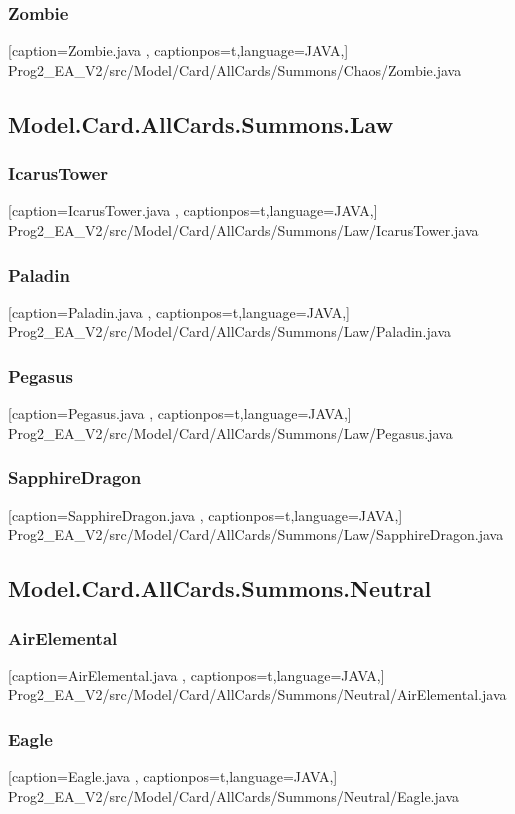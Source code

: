 \documentclass[a4paper,12pt]{scrartcl}
\begin{document}
	\subsubsection{Zombie}
	
	[caption={Zombie.java}
	\label{lst:javaclass},
	captionpos=t,language=JAVA,]
	{Prog2_EA_V2/src/Model/Card/AllCards/Summons/Chaos/Zombie.java}
	\subsection{Model.Card.AllCards.Summons.Law}
	\subsubsection{IcarusTower}
	
	[caption={IcarusTower.java}
	\label{lst:javaclass},
	captionpos=t,language=JAVA,]
	{Prog2_EA_V2/src/Model/Card/AllCards/Summons/Law/IcarusTower.java}
	\subsubsection{Paladin}
	
	[caption={Paladin.java}
	\label{lst:javaclass},
	captionpos=t,language=JAVA,]
	{Prog2_EA_V2/src/Model/Card/AllCards/Summons/Law/Paladin.java}
	\subsubsection{Pegasus}
	
	[caption={Pegasus.java}
	\label{lst:javaclass},
	captionpos=t,language=JAVA,]
	{Prog2_EA_V2/src/Model/Card/AllCards/Summons/Law/Pegasus.java}
	\subsubsection{SapphireDragon}
	
	[caption={SapphireDragon.java}
	\label{lst:javaclass},
	captionpos=t,language=JAVA,]
	{Prog2_EA_V2/src/Model/Card/AllCards/Summons/Law/SapphireDragon.java}
	\subsection{Model.Card.AllCards.Summons.Neutral}
	\subsubsection{AirElemental}
	
	[caption={AirElemental.java}
	\label{lst:javaclass},
	captionpos=t,language=JAVA,]
	{Prog2_EA_V2/src/Model/Card/AllCards/Summons/Neutral/AirElemental.java}
	\subsubsection{Eagle}
	
	[caption={Eagle.java}
	\label{lst:javaclass},
	captionpos=t,language=JAVA,]
	{Prog2_EA_V2/src/Model/Card/AllCards/Summons/Neutral/Eagle.java}
\end{document}
